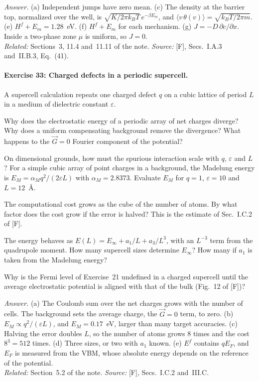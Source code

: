 \documentclass[11pt]{article}      %
\numberwithin{equation}{section}   %
\begin{document}
\textit{Answer.} (a) Independent jumps have zero mean. (c) The density at the barrier top, normalized over the well, is $\sqrt{K/2\pi k_BT}\,e^{-\beta E_m}$, and $\langle v\,\theta(v)\rangle = \sqrt{k_BT/2\pi m}$. (e) $H^f + E_m = 1.28$~eV. (f) $H^f + E_m$ for each mechanism. (g) $J = -D\,\partial c/\partial x$. Inside a two-phase zone $\mu$ is uniform, so $J = 0$.\\
\textit{Related:} Sections~3, 11.4 and~11.11 of the note. \textit{Source:} [F], Secs.~I.A.3 and~II.B.3, Eq.~(41).

\paragraph{Exercise 33: Charged defects in a periodic supercell.}
A supercell calculation repeats one charged defect $q$ on a cubic lattice of period $L$ in a medium of dielectric constant $\varepsilon$.
\begin{parts}
    \item Why does the electrostatic energy of a periodic array of net charges diverge? Why does a uniform compensating background remove the divergence? What happens to the $\vec G = 0$ Fourier component of the potential?
    \item On dimensional grounds, how must the spurious interaction scale with $q$, $\varepsilon$ and $L$? For a simple cubic array of point charges in a background, the Madelung energy is $E_M = \alpha_Mq^2/(2\varepsilon L)$ with $\alpha_M = 2.8373$. Evaluate $E_M$ for $q = 1$, $\varepsilon = 10$ and $L = 12$~\AA.
    \item The computational cost grows as the cube of the number of atoms. By what factor does the cost grow if the error is halved? This is the estimate of Sec.~I.C.2 of [F].
    \item The energy behaves as $E(L) = E_\infty + a_1/L + a_3/L^3$, with an $L^{-3}$ term from the quadrupole moment. How many supercell sizes determine $E_\infty$? How many if $a_1$ is taken from the Madelung energy?
    \item Why is the Fermi level of Exercise~21 undefined in a charged supercell until the average electrostatic potential is aligned with that of the bulk (Fig.~12 of [F])?
\end{parts}
\textit{Answer.} (a) The Coulomb sum over the net charges grows with the number of cells. The background sets the average charge, the $\vec G = 0$ term, to zero. (b) $E_M \propto q^2/(\varepsilon L)$, and $E_M = 0.17$~eV, larger than many target accuracies. (c) Halving the error doubles $L$, so the number of atoms grows $8$ times and the cost $8^3 = 512$ times. (d) Three sizes, or two with $a_1$ known. (e) $E^f$ contains $qE_F$, and $E_F$ is measured from the VBM, whose absolute energy depends on the reference of the potential.\\
\textit{Related:} Section~5.2 of the note. \textit{Source:} [F], Secs.~I.C.2 and~III.C.
\end{document}
